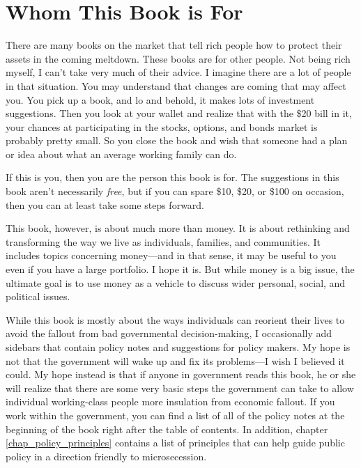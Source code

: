 \section{Whom This Book is For}

There are many books on the market that tell rich people how to protect
their assets in the coming meltdown. These books are for other people.
Not being rich
myself, I can’t take
very much of their advice. I imagine there are a lot of people in that
situation. You may understand that changes are coming that may affect
you. You pick up a book, and lo and behold, it makes lots of investment
suggestions. Then you look at your wallet and realize that with the
\$20 bill in it, your chances at participating in the stocks, options,
and bonds market is probably pretty small. So you close the book and
wish that someone had a plan or idea about what an average working
family can do.

If this is you, then you are the person this book is for. The
suggestions in this book aren’t necessarily \textit{free}, but if you
can spare \$10, \$20, or \$100 on occasion, then you can at least take
some steps forward.

This book, however, is about much more than money. It is about rethinking
and transforming the way we live as individuals, families, and
communities. It includes topics concerning money---and in that
sense, it may be useful to you even if you have a large portfolio. 
I hope it is. But
while money is a big issue, the ultimate goal is to use money as a
vehicle to discuss wider personal, social, and political issues. 

\begin{infonote}
While this book is mostly about the ways individuals can reorient their
lives to avoid the fallout from bad governmental decision-making, I
occasionally add sidebars that contain policy notes
and suggestions for
policy makers. My hope is not that the government will wake up and fix
its problems—I wish I believed it could. My hope instead is that if
anyone in government reads this book, he or
she will realize that there are some very basic steps the government can
take to allow individual working-class people more insulation from
economic fallout.  If you work within the government, you can find a
list of all of the policy notes at the beginning of the book right
after the table of contents.  In addition, chapter \ref{chap_policy_principles}
contains a list of principles that can help guide public policy
in a direction friendly to microsecession.
\end{infonote}

